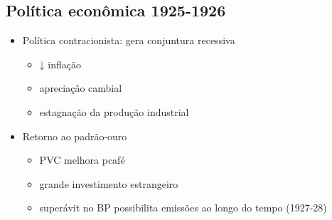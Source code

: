 \documentclass[a4paper,12pt]{article}[abntex2]
\begin{document}
\subsection{\textbf{Política econômica 1925-1926}}
\begin{itemize}
    \item Política contracionista: gera conjuntura recessiva
    \begin{itemize}
        \item ↓ inflação
    \end{itemize}
    \begin{itemize}
        \item apreciação cambial
    \end{itemize}
    \begin{itemize}
        \item estagnação da produção industrial
    \end{itemize}
    \item  Retorno ao padrão-ouro
    \begin{itemize}
        \item  PVC melhora pcafé
    \end{itemize}
    \begin{itemize}
        \item grande investimento estrangeiro
    \end{itemize}
    \begin{itemize}
        \item superávit no BP possibilita emissões ao longo do tempo (1927-28)
    \end{itemize}
\end{itemize}
\end{document}
